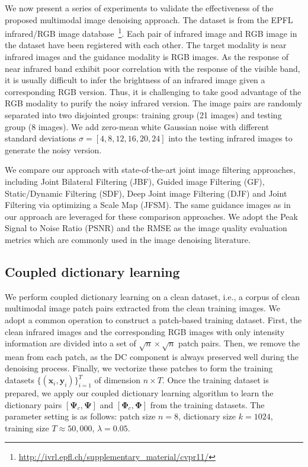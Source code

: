 \documentclass{article}
\begin{document}
We now present a series of experiments to validate the effectiveness of the proposed multimodal image denoising approach. The dataset is from the EPFL infrared/RGB image database~\cite{brown2011multi}\footnote{\url{http://ivrl.epfl.ch/supplementary_material/cvpr11/}}. Each pair of infrared image and RGB image in the dataset have been registered with each other. The target modality is near infrared images and the guidance modality is RGB images. As the response of near infrared band exhibit poor correlation with the response of the visible band, it is usually difficult to infer the brightness of an infrared image given a corresponding RGB version. Thus, it is challenging to take good advantage of the RGB modality to purify the noisy infrared version.
The image pairs are randomly separated into two disjointed groups: training group (21 images) and testing group (8 images). We add zero-mean white Gaussian noise with different standard deviations $\sigma = [4,8,12,16,20,24]$ into the testing infrared images to generate the noisy version.

We compare our approach with state-of-the-art joint image filtering approaches, including Joint Bilateral Filtering (JBF)\cite{kopf2007joint}, Guided image Filtering (GF)\cite{he2013guided}, Static/Dynamic Filtering (SDF)\cite{ham2017robust}, Deep Joint image Filtering (DJF)\cite{li2016deep} and Joint Filtering via optimizing a Scale Map (JFSM)\cite{shen2015multispectral}. The same guidance images as in our approach are leveraged for these comparison approaches.
We adopt the Peak Signal to Noise Ratio (PSNR) and the RMSE as the image quality evaluation metrics which are commonly used in the image denoising literature. 




\vspace{-0.2cm}

\subsection{Coupled dictionary learning}
We perform coupled dictionary learning on a clean dataset, i.e., a corpus of clean multimodal image patch pairs extracted from the clean training images. We adopt a common operation to construct a patch-based training dataset. First, the clean infrared images and the corresponding RGB images with only intensity information are divided into a set of $\sqrt{n} \times \sqrt{n}$ patch pairs. Then, we remove the mean from each patch, as the DC component is always preserved well during the denoising process. Finally, we vectorize these patches to form the training datasets $\{(\mathbf{x}_i, \mathbf{y}_i) \}_{i=1}^T$ of dimension $n \times T$. Once the training dataset is prepared, we apply our coupled dictionary learning algorithm to learn the dictionary pairs $[\boldsymbol{\Psi}_{c},\boldsymbol{\Psi}]$ and $[\boldsymbol{\Phi}_{c},\boldsymbol{\Phi}]$ from the training datasets. The parameter setting is as follows: patch size $ n = 8 $, dictionary size $k= 1024$, training size $T \approx 50,000$, $\lambda = 0.05$. 
\end{document}
